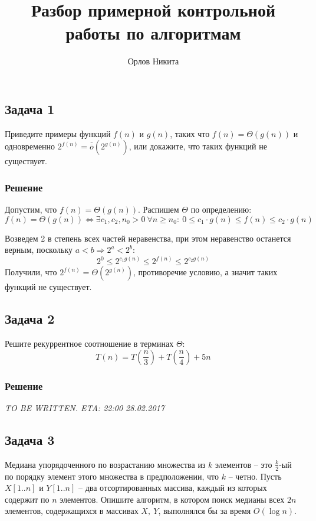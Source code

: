 \documentclass[a4letter,12pt]{article}
\newcommand{\doverline}[1]{\overline{\overline{#1}}}
\begin{document}
	\title{Разбор примерной контрольной работы по алгоритмам}
	\author{Орлов Никита}
	\maketitle
	
	\subsection*{Задача 1}	
	Приведите примеры функций $f(n)$ и $g(n)$, таких что $f(n) = \Theta(g(n))$ и одновременно $2^{f(n)} = \doverline{o}(2^{g(n)})$, или докажите, что таких функций не существует.
	
	\subsubsection*{Решение}
	Допустим, что $f(n) = \Theta(g(n))$. Распишем $\Theta$ по определению:
	\[
	f(n) = \Theta(g(n))
	\Leftrightarrow
	\exists c_1, c_2,n_0 > 0 \ \forall n\geqslant n_0: \
	0\leqslant c_1\cdot g(n)\leqslant f(n) \leqslant c_2 \cdot g(n)
	\]
	
	Возведем 2 в степень всех частей неравенства, при этом неравенство останется верным, поскольку $a < b \Rightarrow 2^a < 2^b$:
	\[
	2^0 \leqslant 2^{c_1g(n)} \leqslant 2^{f(n)} \leqslant 2^{c_2g(n)}
	\]
	Получили, что $2^{f(n)} = \Theta(2^{g(n)})$, противоречие условию, а значит таких функций не существует.
	
	\subsection*{Задача 2}
	
	Решите рекуррентное соотношение в терминах $\Theta$:
	\[
	T(n) = T(\frac n3) + T(\frac n4) + 5n
	\]
	
	\subsubsection*{Решение}
	\textit{TO BE WRITTEN. ETA: 22:00 28.02.2017}
	
	\subsection*{Задача 3}
	Медиана упорядоченного по возрастанию множества из $k$ элементов -- это $\frac k2$-ый по порядку элемент этого множества в предположении, что $k$ -- четно. Пусть $X[1..n]$ и $Y[1..n]$ -- два отсортированных массива, каждый из которых содержит по $n$ элементов. Опишите алгоритм, в котором поиск медианы всех $2n$ элементов, содержащихся в массивах $X, \ Y$, выполнялся бы за время $O(\log n)$.
	
\end{document}
